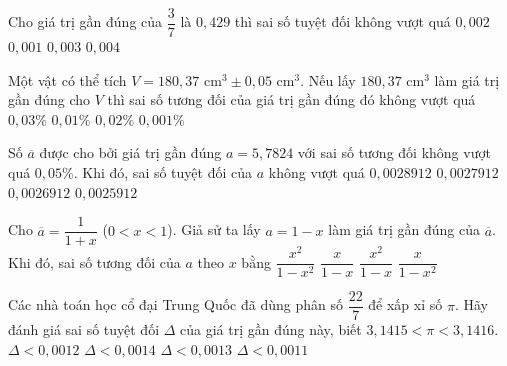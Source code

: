 \begin{ex}
	Cho giá trị gần đúng của $\dfrac{3}{7}$ là $0{,}429$ thì sai số tuyệt đối không vượt quá
	\choice
	{$0{,}002$}
	{\True $0{,}001$}
	{$0{,}003$}
	{$0{,}004$}
\end{ex}

\begin{ex}
	Một vật có thể tích $V = 180{,}37\text{ cm}^3 \pm 0{,}05\text{ cm}^3$. Nếu lấy $180{,}37\text{ cm}^3$ làm giá trị gần đúng cho $V$ thì sai số tương đối của giá trị gần đúng đó không vượt quá
	\choice
	{\True $0{,}03\%$}
	{$0{,}01\%$}
	{$0{,}02\%$}
	{$0{,}001\%$}
\end{ex}

\begin{ex}
	Số $\overline{a}$ được cho bởi giá trị gần đúng $a = 5{,}7824$ với sai số tương đối không vượt quá $0{,}05\%$. Khi đó, sai số tuyệt đối của $a$ không vượt quá
	\choice
	{\True $0{,}0028912$}
	{$0{,}0027912$}
	{$0{,}0026912$}
	{$0{,}0025912$}
\end{ex}

\begin{ex}
	Cho $\overline{a} = \dfrac{1}{1 + x}$ ($0 < x < 1$). Giả sử ta lấy $a = 1 - x$ làm giá trị gần đúng của $\overline{a}$. Khi đó, sai số tương đối của $a$ theo $x$ bằng
	\choice
	{\True $\dfrac{x^2}{1 - x^2}$}
	{$\dfrac{x}{1 - x}$}
	{$\dfrac{x^2}{1 - x}$}
	{$\dfrac{x}{1 - x^2}$}
\end{ex}

\begin{ex}
	Các nhà toán học cổ đại Trung Quốc đã dùng phân số $\dfrac{22}{7}$ để xấp xỉ số $\pi$. Hãy đánh giá sai số tuyệt đối $\Delta$ của giá trị gần đúng này, biết $3{,}1415 < \pi < 3{,}1416$.
	\choice
	{$\Delta < 0{,}0012$}
	{\True $\Delta < 0{,}0014$}
	{$\Delta < 0{,}0013$}
	{$\Delta < 0{,}0011$}
\end{ex}

